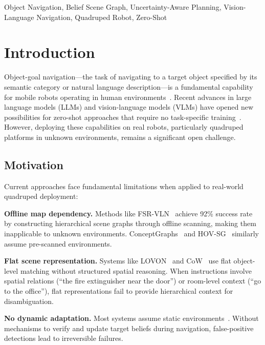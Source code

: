 \documentclass[conference]{IEEEtran}
\begin{document}
\begin{IEEEkeywords}
Object Navigation, Belief Scene Graph, Uncertainty-Aware Planning, Vision-Language Navigation, Quadruped Robot, Zero-Shot
\end{IEEEkeywords}

\section{Introduction}
\label{sec:intro}

Object-goal navigation---the task of navigating to a target object specified by its semantic category or natural language description---is a fundamental capability for mobile robots operating in human environments~\cite{batra2020objectnav, yadav2022hm3d}.
Recent advances in large language models (LLMs) and vision-language models (VLMs) have opened new possibilities for zero-shot approaches that require no task-specific training~\cite{sgnav2024, esc2023, l3mvn2023}.
However, deploying these capabilities on real robots, particularly quadruped platforms in unknown environments, remains a significant open challenge.

\subsection{Motivation}

Current approaches face fundamental limitations when applied to real-world quadruped deployment:

\textbf{Offline map dependency.}
Methods like FSR-VLN~\cite{fsrvln2025} achieve 92\% success rate by constructing hierarchical scene graphs through offline scanning, making them inapplicable to unknown environments.
ConceptGraphs~\cite{conceptgraphs2024} and HOV-SG~\cite{hovsg2024} similarly assume pre-scanned environments.

\textbf{Flat scene representation.}
Systems like LOVON~\cite{lovon2025} and CoW~\cite{cow2023} use flat object-level matching without structured spatial reasoning.
When instructions involve spatial relations (``the fire extinguisher near the door'') or room-level context (``go to the office''), flat representations fail to provide hierarchical context for disambiguation.

\textbf{No dynamic adaptation.}
Most systems assume static environments~\cite{fsrvln2025, hovsg2024}.
Without mechanisms to verify and update target beliefs during navigation, false-positive detections lead to irreversible failures.
\end{document}
